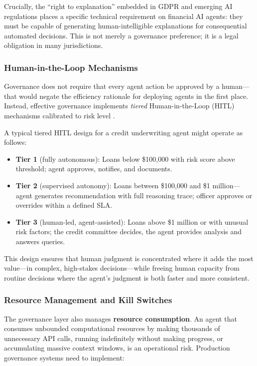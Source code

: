 \documentclass{article}
\begin{document}
Crucially, the ``right to explanation'' embedded in GDPR and emerging AI regulations \cite{act2024eu} places a specific technical requirement on financial AI agents: they must be capable of generating human-intelligible explanations for consequential automated decisions. This is not merely a governance preference; it is a legal obligation in many jurisdictions.

\subsubsection{Human-in-the-Loop Mechanisms}

Governance does not require that every agent action be approved by a human—that would negate the efficiency rationale for deploying agents in the first place. Instead, effective governance implements \textit{tiered} Human-in-the-Loop (HITL) mechanisms calibrated to risk level \cite{cihon2021corporate}.

A typical tiered HITL design for a credit underwriting agent might operate as follows:
\begin{itemize}
  \item \textbf{Tier 1} (fully autonomous): Loans below \$100,000 with risk score above threshold; agent approves, notifies, and documents.
  \item \textbf{Tier 2} (supervised autonomy): Loans between \$100,000 and \$1 million—agent generates recommendation with full reasoning trace; officer approves or overrides within a defined SLA.
  \item \textbf{Tier 3} (human-led, agent-assisted): Loans above \$1 million or with unusual risk factors; the credit committee decides, the agent provides analysis and answers queries.
\end{itemize}

This design ensures that human judgment is concentrated where it adds the most value—in complex, high-stakes decisions—while freeing human capacity from routine decisions where the agent's judgment is both faster and more consistent.

\subsubsection{Resource Management and Kill Switches}

The governance layer also manages \textbf{resource consumption}. An agent that consumes unbounded computational resources by making thousands of unnecessary API calls, running indefinitely without making progress, or accumulating massive context windows, is an operational risk. Production governance systems need to implement:
\end{document}
